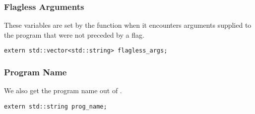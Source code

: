 \subsubsection{Flagless Arguments}

These variables are set by the  function when it encounters arguments supplied to the program that were not preceded by a flag.

\begin{verbatim}
extern std::vector<std::string> flagless_args;
\end{verbatim}

\subsubsection{Program Name}

We also get the program name out of .

\begin{verbatim}
extern std::string prog_name;
\end{verbatim}
